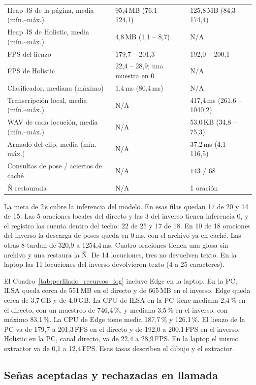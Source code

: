\begin{table}[H]
\begin{tabularx}{\textwidth}{@{}>{\raggedright\arraybackslash}p{4.8cm} X X@{}}
Heap JS de la página, media (mín.--máx.) & 95{,}4\,MB (76{,}1 -- 124{,}1) & 125{,}8\,MB (84{,}3 -- 174{,}4) \\
Heap JS de Holistic, media (mín.--máx.) & 4{,}8\,MB (1{,}1 -- 8{,}7) & N/A \\
FPS del lienzo & 179{,}7 -- 201{,}3 & 192{,}0 -- 200{,}1 \\
FPS de Holistic & 22{,}4 -- 28{,}9; una muestra en 0 & N/A \\
Clasificador, mediana (máximo) & 1{,}4\,ms (80{,}4\,ms) & N/A \\
Transcripción local, media (mín.--máx.) & N/A & 417{,}4\,ms (261{,}6 -- 1040{,}2) \\
WAV de cada locución, media (mín.--máx.) & N/A & 53{,}0\,KB (34{,}8 -- 75{,}3) \\
Armado del clip, media (mín.--máx.) & N/A & 37{,}2\,ms (4{,}1 -- 116{,}5) \\
Consultas de pose / aciertos de caché & N/A & $143$ / $68$ \\
Ñ restaurada & N/A & 1 oración \\
\bottomrule
\end{tabularx}
\end{table}

La meta de 2\,s cubre la inferencia del modelo. En esas filas quedan 17 de 20 y 14 de 15. Las 5 oraciones locales del directo y las 3 del inverso tienen inferencia 0, y el registro las cuenta dentro del techo: 22 de 25 y 17 de 18. En 10 de 18 oraciones del inverso la descarga de poses queda en 0\,ms, con el archivo ya en caché. Las otras 8 tardan de 320{,}9 a 1254{,}4\,ms. Cuatro oraciones tienen una glosa sin archivo y una restaura la Ñ. De 14 locuciones, tres no devuelven texto. En la laptop las 11 locuciones del inverso devolvieron texto (4 a 25 caracteres).

El Cuadro~\ref{tab:perfilado_recursos_log} incluye Edge en la laptop. En la PC, ILSA queda cerca de 551\,MB en el directo y de 665\,MB en el inverso. Edge queda cerca de 3,7\,GB y de 4,0\,GB. La CPU de ILSA en la PC tiene mediana 2{,}4\,\% en el directo, con un muestreo de 746{,}4\,\%, y mediana 3{,}5\,\% en el inverso, con máximo 83{,}1\,\%. La CPU de Edge tiene media 187{,}7\,\% y 126{,}1\,\%. El lienzo de la PC va de 179{,}7 a 201{,}3\,FPS en el directo y de 192{,}0 a 200{,}1\,FPS en el inverso. Holistic en la PC, canal directo, va de 22{,}4 a 28{,}9\,FPS. En la laptop el mismo extractor va de 0{,}1 a 12{,}4\,FPS. Esas tasas describen el dibujo y el extractor.

\subsection{Señas aceptadas y rechazadas en llamada}
\label{sec:senas_vivo}

